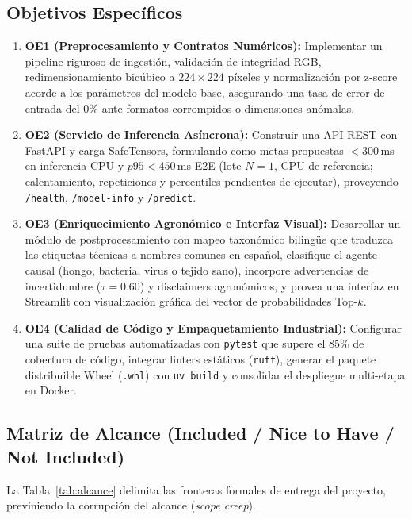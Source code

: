 \documentclass[12pt,letterpaper]{article}
\begin{document}
\subsection{Objetivos Específicos}
\begin{enumerate}[leftmargin=*]
    \item \textbf{OE1 (Preprocesamiento y Contratos Numéricos):} Implementar un pipeline riguroso de ingestión, validación de integridad RGB, redimensionamiento bicúbico a $224 \times 224$ píxeles y normalización por z-score acorde a los parámetros del modelo base, asegurando una tasa de error de entrada del 0\% ante formatos corrompidos o dimensiones anómalas.
    \item \textbf{OE2 (Servicio de Inferencia Asíncrona):} Construir una API REST con FastAPI y carga SafeTensors, formulando como metas propuestas $< 300$\,ms en inferencia CPU y $p95 < 450$\,ms E2E (lote $N=1$, CPU de referencia; calentamiento, repeticiones y percentiles pendientes de ejecutar), proveyendo \texttt{/health}, \texttt{/model-info} y \texttt{/predict}.
    \item \textbf{OE3 (Enriquecimiento Agronómico e Interfaz Visual):} Desarrollar un módulo de postprocesamiento con mapeo taxonómico bilingüe que traduzca las etiquetas técnicas a nombres comunes en español, clasifique el agente causal (hongo, bacteria, virus o tejido sano), incorpore advertencias de incertidumbre ($\tau = 0.60$) y disclaimers agronómicos, y provea una interfaz en Streamlit con visualización gráfica del vector de probabilidades Top-$k$.
    \item \textbf{OE4 (Calidad de Código y Empaquetamiento Industrial):} Configurar una suite de pruebas automatizadas con \texttt{pytest} que supere el 85\% de cobertura de código, integrar linters estáticos (\texttt{ruff}), generar el paquete distribuible Wheel (\texttt{.whl}) con \texttt{uv build} y consolidar el despliegue multi-etapa en Docker.
\end{enumerate}

\subsection{Matriz de Alcance (Included / Nice to Have / Not Included)}
La Tabla~\ref{tab:alcance} delimita las fronteras formales de entrega del proyecto, previniendo la corrupción del alcance (\textit{scope creep}).
\end{document}
